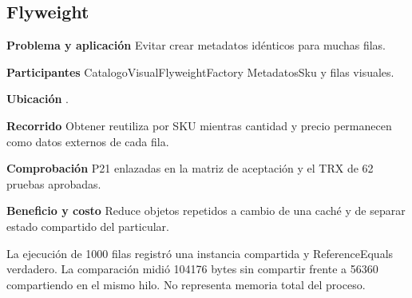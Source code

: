 \noindent\begin{minipage}{\linewidth}
\subsection{Flyweight}
\textbf{Problema y aplicación} Evitar crear metadatos idénticos para muchas filas.

\textbf{Participantes} CatalogoVisualFlyweightFactory MetadatosSku y filas visuales.

\textbf{Ubicación} \href{https://github.com/Alan77-bot/LogiMarket360Alan/blob/68bda51063441415524ede51bdf61649ee9b4973/LogiMarket.Application/Catalogo/CatalogoVisualFlyweightFactory.cs#L6}{}.

\textbf{Recorrido} Obtener reutiliza por SKU mientras cantidad y precio permanecen como datos externos de cada fila.


\textbf{Comprobación} P21 enlazadas en la matriz de aceptación y el TRX de 62 pruebas aprobadas.

\textbf{Beneficio y costo} Reduce objetos repetidos a cambio de una caché y de separar estado compartido del particular.

La ejecución de 1000 filas registró una instancia compartida y ReferenceEquals verdadero. La comparación midió 104176 bytes sin compartir frente a 56360 compartiendo en el mismo hilo. No representa memoria total del proceso.

\end{minipage}\par\smallskip
